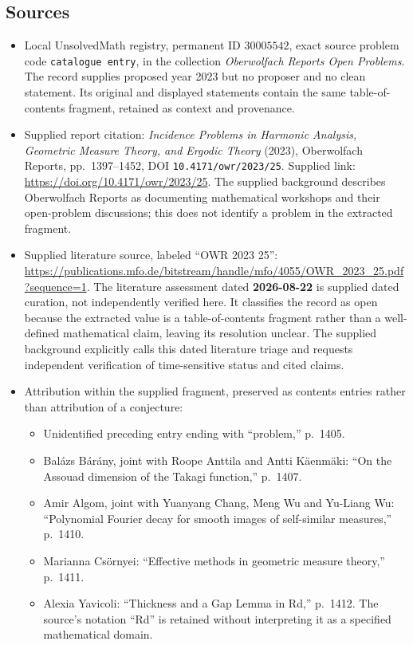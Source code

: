 \documentclass[11pt]{article}
\begin{document}
\subsection{Sources}
\begin{itemize}
\item Local UnsolvedMath registry, permanent ID \(30005542\), exact source problem code \texttt{catalogue entry}, in the collection \emph{Oberwolfach Reports Open Problems}. The record supplies proposed year 2023 but no proposer and no clean statement. Its original and displayed statements contain the same table-of-contents fragment, retained as context and provenance.
\item Supplied report citation: \emph{Incidence Problems in Harmonic Analysis, Geometric Measure Theory, and Ergodic Theory} (2023), Oberwolfach Reports, pp.~1397--1452, DOI \texttt{10.4171/owr/2023/25}. Supplied link: \url{https://doi.org/10.4171/owr/2023/25}. The supplied background describes Oberwolfach Reports as documenting mathematical workshops and their open-problem discussions; this does not identify a problem in the extracted fragment.
\item Supplied literature source, labeled ``OWR 2023 25'': \url{https://publications.mfo.de/bitstream/handle/mfo/4055/OWR_2023_25.pdf?sequence=1}. The literature assessment dated \textbf{2026-08-22} is supplied dated curation, not independently verified here. It classifies the record as open because the extracted value is a table-of-contents fragment rather than a well-defined mathematical claim, leaving its resolution unclear. The supplied background explicitly calls this dated literature triage and requests independent verification of time-sensitive status and cited claims.
\item Attribution within the supplied fragment, preserved as contents entries rather than attribution of a conjecture:
\begin{itemize}
\item Unidentified preceding entry ending with ``problem,'' p.~1405.
\item Balázs Bárány, joint with Roope Anttila and Antti Käenmäki: ``On the Assouad dimension of the Takagi function,'' p.~1407.
\item Amir Algom, joint with Yuanyang Chang, Meng Wu and Yu-Liang Wu: ``Polynomial Fourier decay for smooth images of self-similar measures,'' p.~1410.
\item Marianna Csörnyei: ``Effective methods in geometric measure theory,'' p.~1411.
\item Alexia Yavicoli: ``Thickness and a Gap Lemma in Rd,'' p.~1412. The source's notation ``Rd'' is retained without interpreting it as a specified mathematical domain.

\end{itemize}
\end{itemize}
\end{document}
